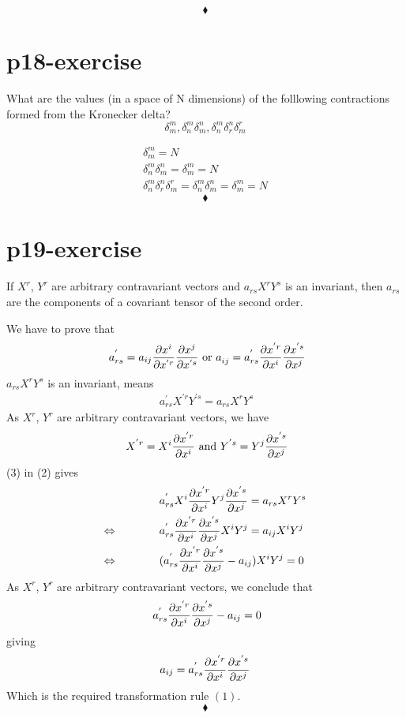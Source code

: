 $$\blacklozenge$$
\pagebreak[4]

\section{p18-exercise}

\begin{tcolorbox}
What are the values (in a space of N dimensions) of the folllowing contractions formed from the Kronecker delta?
$$\delta^{m}_{m},  \delta^{m}_{n} \delta^{n}_{m},  \delta^{m}_{n} \delta^{n}_{r} \delta^{r}_{m}$$
\end{tcolorbox}
\begin{align}
\delta^{m}_{m} = N\\
\delta^{m}_{n} \delta^{n}_{m} = \delta^{m}_{m} = N\\
\delta^{m}_{n} \delta^{n}_{r} \delta^{r}_{m} = \delta^{m}_{n} \delta^{n}_{m} = \delta^{m}_{m} = N
\end{align}
$$\blacklozenge$$
\pagebreak[4]

\section{p19-exercise}
\begin{tcolorbox}
If $X^{r}$, $Y^{r}$ are arbitrary contravariant vectors and $a_{rs}X^{r}Y^{s}$ is an invariant, then $a_{rs}$ are the components of a covariant tensor of the second order. 
\end{tcolorbox}
We have to prove that
\begin{align}
\ a^{'}_{rs} = a_{ij}\pdv{x^{i}}{x^{'r}}\pdv{x^{j}}{x^{'s}} \text{ or } a^{}_{ij} = a^{'}_{rs}\pdv{x^{'r}}{x^{i}}\pdv{x^{'s}}{x^{j}}
\end{align}
$a_{rs}X^{r}Y^{s}$ is an invariant, means
\begin{align}
\ a^{'}_{rs}X^{'r}Y^{'s} = a_{rs}X^{r}Y^{s}
\end{align}
As $X^{r}$, $Y^{r}$ are arbitrary contravariant vectors, we have
\begin{align}
\ X^{'r} = X^{i}\pdv{x^{'r}}{x^{i}} \text{   and  } Y^{'s} = Y^{j}\pdv{x^{'s}}{x^{j}}
\end{align}
(3) in (2) gives
\begin{align*}
& a^{'}_{rs}X^{i}\pdv{x^{'r}}{x^{i}}Y^{j}\pdv{x^{'s}}{x^{j}} = a_{rs}X^{r}Y^{s}\\
\Leftrightarrow \quad\quad\quad\quad &a^{'}_{rs}\pdv{x^{'r}}{x^{i}}\pdv{x^{'s}}{x^{j}}X^{i}Y^{j} = a_{ij}X^{i}Y^{j}\\
\Leftrightarrow \quad\quad\quad\quad &(a^{'}_{rs}\pdv{x^{'r}}{x^{i}}\pdv{x^{'s}}{x^{j}} - a_{ij})X^{i}Y^{j} = 0
\end{align*}
As $X^{r}$, $Y^{r}$ are arbitrary contravariant vectors, we conclude that 
\begin{align*}
\ a^{'}_{rs}\pdv{x^{'r}}{x^{i}}\pdv{x^{'s}}{x^{j}} - a_{ij} = 0
\end{align*}
giving
\begin{align}
a_{ij} =  a^{'}_{rs}\pdv{x^{'r}}{x^{i}}\pdv{x^{'s}} {x^{j}}
\end{align}
Which is the required transformation rule $(1)$.
$$\blacklozenge$$
\pagebreak[4]

